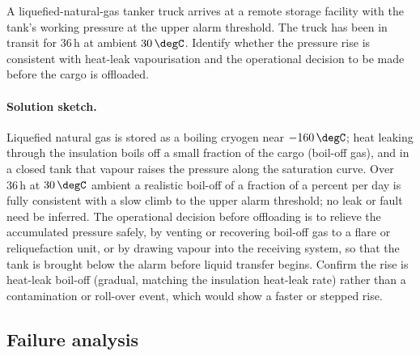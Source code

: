 \begin{exercise}
A liquefied-natural-gas tanker truck arrives at a remote storage
facility with the tank's working pressure at the upper alarm
threshold. The truck has been in transit for $36\,\text{h}$ at
ambient $30\,\degC$. Identify whether the pressure rise is
consistent with heat-leak vapourisation and the operational decision
to be made before the cargo is offloaded.

\paragraph{Solution sketch.} Liquefied natural gas is stored as a boiling
cryogen near $-160\,\degC$; heat leaking through the insulation boils off
a small fraction of the cargo (boil-off gas), and in a closed tank that
vapour raises the pressure along the saturation curve. Over $36\,\text{h}$
at $30\,\degC$ ambient a realistic boil-off of a fraction of a percent per
day is fully consistent with a slow climb to the upper alarm threshold; no
leak or fault need be inferred. The operational decision before offloading
is to relieve the accumulated pressure safely, by venting or recovering
boil-off gas to a flare or reliquefaction unit, or by drawing vapour into
the receiving system, so that the tank is brought below the alarm before
liquid transfer begins. Confirm the rise is heat-leak boil-off (gradual,
matching the insulation heat-leak rate) rather than a contamination or
roll-over event, which would show a faster or stepped rise.
\end{exercise}

\subsection*{Failure analysis}

